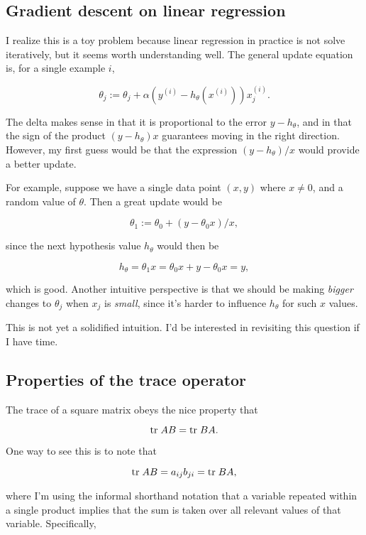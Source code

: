 \documentclass[]{article}
\begin{document}
\subsection{Gradient descent on linear
regression}\label{gradient-descent-on-linear-regression}

I realize this is a toy problem because linear regression in practice is
not solve iteratively, but it seems worth understanding well. The
general update equation is, for a single example \(i\),

\[\theta_j := \theta_j + \alpha(y^{(i)} - h_\theta(x^{(i)}))x_j^{(i)}.\]

The delta makes sense in that it is proportional to the error
\(y-h_\theta\), and in that the sign of the product \((y-h_\theta)x\)
guarantees moving in the right direction. However, my first guess would
be that the expression \((y-h_\theta)/x\) would provide a better update.

For example, suppose we have a single data point \((x, y)\) where
\(x\ne 0\), and a random value of \(\theta\). Then a great update would
be

\[\theta_1 := \theta_0 + (y - \theta_0 x)/x,\]

since the next hypothesis value \(h_\theta\) would then be

\[h_\theta = \theta_1 x = \theta_0 x + y - \theta_0x = y,\]

which is good. Another intuitive perspective is that we should be making
\emph{bigger} changes to \(\theta_j\) when \(x_j\) is \emph{small},
since it's harder to influence \(h_\theta\) for such \(x\) values.

This is not yet a solidified intuition. I'd be interested in revisiting
this question if I have time.

\subsection{Properties of the trace
operator}\label{properties-of-the-trace-operator}

The trace of a square matrix obeys the nice property that

\begin{equation}\text{tr}\; AB = \text{tr}\; BA.\label{eq:persistent_trace}\end{equation}

One way to see this is to note that

\[\text{tr}\; AB = a_{ij}b_{ji} = \text{tr}\; BA,\]

where I'm using the informal shorthand notation that a variable repeated
within a single product implies that the sum is taken over all relevant
values of that variable. Specifically,
\end{document}
